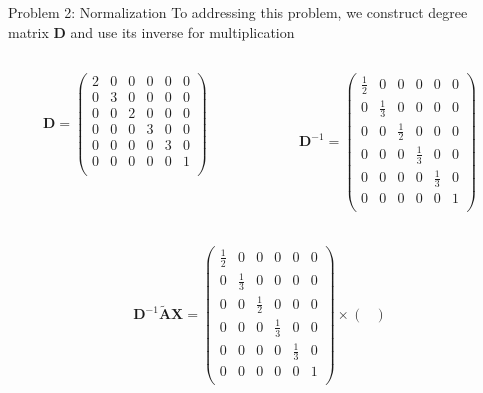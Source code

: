 \documentclass[notheorems, aspectratio=54]{beamer}
\begin{document}
	\begin{frame}{Problem 2: Normalization}
		To addressing this problem, we construct degree matrix $\mathbf{D}$ and use its inverse for multiplication
		\begin{columns}
			\begin{column}{0.5\textwidth}
				\begin{gather*}
					\mathbf{D} = \begin{pmatrix}
						2 & 0 & 0 & 0 & 0 & 0\\
						0 & 3 & 0 & 0 & 0 & 0\\
						0 & 0 & 2 & 0 & 0 & 0\\
						0 & 0 & 0 & 3 & 0 & 0\\
						0 & 0 & 0 & 0 & 3 & 0\\
						0 & 0 & 0 & 0 & 0 & 1\\ 
					\end{pmatrix}
				\end{gather*}
			\end{column}
			\begin{column}{0.5\textwidth}
				\begin{gather*}
					\mathbf{D}^{-1} = \begin{pmatrix}
						\frac{1}{2} & 0 & 0 & 0 & 0 & 0\\
						0 & \frac{1}{3} & 0 & 0 & 0 & 0\\
						0 & 0 & \frac{1}{2} & 0 & 0 & 0\\
						0 & 0 & 0 & \frac{1}{3} & 0 & 0\\
						0 & 0 & 0 & 0 & \frac{1}{3} & 0\\
						0 & 0 & 0 & 0 & 0 & 1\\ 
					\end{pmatrix}
				\end{gather*}
			\end{column}
		\end{columns}
		\begin{gather*}
			\mathbf{D}^{-1}\widetilde{\mathbf{A}}\mathbf{X} = \begin{pmatrix}
				\frac{1}{2} & 0 & 0 & 0 & 0 & 0\\
				0 & \frac{1}{3} & 0 & 0 & 0 & 0\\
				0 & 0 & \frac{1}{2} & 0 & 0 & 0\\
				0 & 0 & 0 & \frac{1}{3} & 0 & 0\\
				0 & 0 & 0 & 0 & \frac{1}{3} & 0\\
				0 & 0 & 0 & 0 & 0 & 1\\ 
			\end{pmatrix} \times \begin{pmatrix}

\end{pmatrix}
\end{gather*}
\end{frame}
\end{document}
